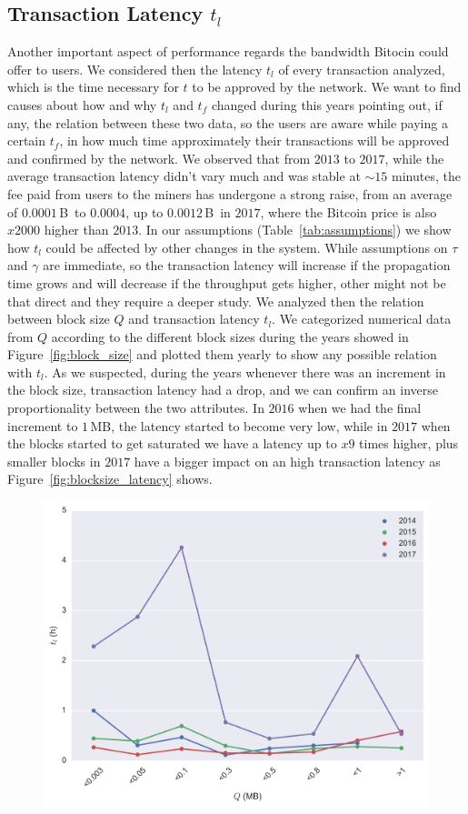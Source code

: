 \documentclass[USenglish]{uit-thesis}
\def\bitcoin{\leavevmode\rlap{\hskip.5pt-}B}
\begin{document}
\subsection{Transaction Latency $t_l$}
\label{sec:txslatency}
Another important aspect of performance
regards the bandwidth Bitocin could offer to users.
We considered then the latency $t_l$ of every
transaction analyzed, which is the time necessary for
$t$ to be approved by the network. We want to find
causes about how and why $t_l$ and $t_f$
changed during this years pointing out, if any,
the relation between these two data, so the
users are aware while paying a certain $t_f$, in how much
time approximately their transactions will be approved
and confirmed by the network.
We observed that from $2013$ to $2017$, while the average
transaction latency didn't vary much and was stable
at $\sim$$15$ minutes, the fee paid from users to the miners
has undergone a strong raise, from an average of $0.0001$\,\bitcoin~to
$0.0004$, up to $0.0012$\,\bitcoin~in $2017$, where the Bitcoin price is
also $x2000$ higher than $2013$. In our assumptions (Table~\ref{tab:assumptions})
we show how $t_l$ could be affected by other changes in the system.
While assumptions on $\tau$ and $\gamma$ are immediate,
so the transaction latency will increase if the
propagation time grows and will decrease if the throughput
gets higher, other might not be that direct and they require
a deeper study. We analyzed then the relation between
block size $Q$ and transaction latency $t_l$. We categorized
numerical data from $Q$ according to the different block
sizes during the years showed in Figure~\ref{fig:block_size}
and plotted them yearly to show
any possible relation with $t_l$.
As we suspected, during the years
whenever there was an increment in the block size, transaction
latency had a drop, and we can confirm an inverse proportionality
between the two attributes. In $2016$ when we had the final
increment to $1$\,MB, the latency started
to become very low, while in $2017$ when the blocks
started to get saturated we have a latency up to
$x9$ times higher, plus smaller blocks in $2017$ have
a bigger impact on an high transaction latency as
Figure~\ref{fig:blocksize_latency} shows.
\begin{figure}[h]
	\centering
	\includegraphics[width=1\textwidth]{img/blocksize_latency}

\end{figure}$$
\end{document}
